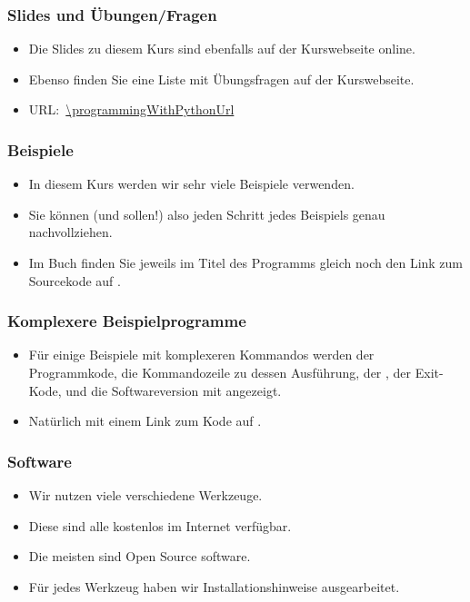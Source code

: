 \documentclass[aspectratio=169,mathserif,notheorems]{beamer}%
\begin{document}
%
\begin{frame}%
\frametitle{Slides und Übungen/Fragen}%
\begin{itemize}%
\item Die Slides zu diesem Kurs sind ebenfalls auf der Kurswebseite online.%
\item<2-> Ebenso finden Sie eine Liste mit Übungsfragen auf der Kurswebseite.%
\item<3-> URL:~\expandafter\url{\programmingWithPythonUrl}%
\end{itemize}%
\end{frame}%
%
\begin{frame}[fragile,t]
\frametitle{Beispiele}%
\begin{itemize}%
\item In diesem Kurs werden wir sehr viele Beispiele verwenden.
\item<2-> Sie können (und sollen!) also jeden Schritt jedes Beispiels genau nachvollziehen.%
\item<3-> Im Buch finden Sie jeweils im Titel des Programms gleich noch den Link zum Sourcekode auf \github.%
\end{itemize}%
%
%
\end{frame}
%
\begin{frame}%
\frametitle{Komplexere Beispielprogramme}%
\parbox{0.435\linewidth}{%
\begin{itemize}%
\item Für einige Beispiele mit komplexeren Kommandos werden der Programmkode, die Kommandozeile zu dessen Ausführung, der \cite{J2024PTOGBSI8IS12E:SSSSIS}, der Exit-Kode\cite{J2024PTOGBSI8IS12E:TAP}, und die Softwareversion mit angezeigt.%
\item<2-> Natürlich mit einem Link zum Kode auf \github.%
\end{itemize}%
}%
%
\end{frame}%
%
\begin{frame}%
\frametitle{Software}%
\begin{itemize}%
\item Wir nutzen viele verschiedene Werkzeuge.%
\item<2-> Diese sind alle kostenlos im Internet verfügbar.%
\item<3-> Die meisten sind Open Source software.%
\item<4-> Für jedes Werkzeug haben wir Installationshinweise ausgearbeitet.%
\end{itemize}%
\end{frame}%
\end{document}
